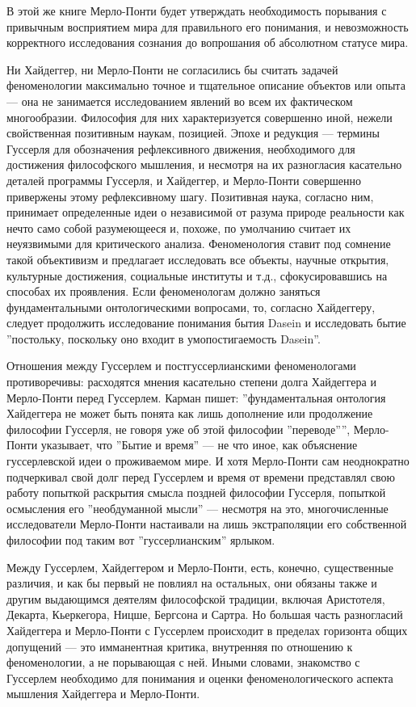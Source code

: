 \documentclass[11pt]{book}
\begin{document}
\relax
{}\relax
\smallskip

В этой же книге Мерло-Понти будет утверждать необходимость порывания с привычным восприятием мира для правильного его понимания, и невозможность корректного исследования сознания до вопрошания об абсолютном статусе мира.

Ни Хайдеггер, ни Мерло-Понти не согласились бы считать задачей феноменологии максимально точное и тщательное описание объектов или опыта --- она не занимается исследованием явлений во всем их фактическом многообразии. Философия для них характеризуется совершенно иной, нежели свойственная позитивным наукам, позицией. Эпохе и редукция --- термины Гуссерля для обозначения рефлексивного движения, необходимого для достижения философского мышления, и несмотря на их разногласия касательно деталей программы Гуссерля, и Хайдеггер, и Мерло-Понти совершенно привержены этому рефлексивному шагу. Позитивная наука, согласно ним, принимает определенные идеи о независимой от разума природе реальности как нечто само собой разумеющееся и, похоже, по умолчанию считает их неуязвимыми для критического анализа. Феноменология ставит под сомнение такой объективизм и предлагает исследовать все объекты, научные открытия, культурные достижения, социальные институты и т.д., сфокусировавшись на способах их проявления. Если феноменологам должно заняться фундаментальными онтологическими вопросами, то, согласно Хайдеггеру, следует продолжить исследование понимания бытия Dasein и исследовать бытие ''постольку, поскольку оно входит в умопостигаемость Dasein''.

Отношения между Гуссерлем и постгуссерлианскими феноменологами противоречивы: расходятся мнения касательно степени долга Хайдеггера и Мерло-Понти перед Гуссерлем. Карман пишет: ''фундаментальная онтология Хайдеггера не может быть понята как лишь дополнение или продолжение философии Гуссерля, не говоря уже об этой философии ''переводе'''', Мерло-Понти указывает, что ''Бытие и время'' --- не что иное, как объяснение гуссерлевской идеи о проживаемом мире. И хотя Мерло-Понти сам неоднократно подчеркивал свой долг перед Гуссерлем и время от времени представлял свою работу попыткой раскрытия смысла поздней философии Гуссерля, попыткой осмысления его ''необдуманной мысли'' --- несмотря на это, многочисленные исследователи Мерло-Понти настаивали на лишь экстраполяции его собственной философии под таким вот ''гуссерлианским'' ярлыком.

Между Гуссерлем, Хайдеггером и Мерло-Понти, есть, конечно, существенные различия, и как бы первый не повлиял на остальных, они обязаны также и другим выдающимся деятелям философской традиции, включая Аристотеля, Декарта, Кьеркегора, Ницше, Бергсона и Сартра. Но большая часть разногласий Хайдеггера и Мерло-Понти с Гуссерлем происходит в пределах горизонта общих допущений --- это имманентная критика, внутренняя по отношению к феноменологии, а не порывающая с ней. Иными словами, знакомство с Гуссерлем необходимо для понимания и оценки феноменологического аспекта мышления Хайдеггера и Мерло-Понти.
\end{document}
